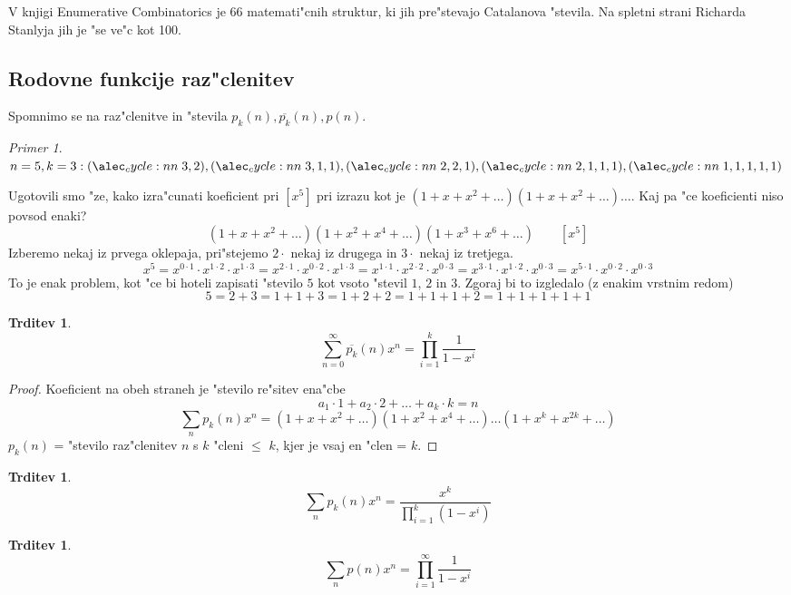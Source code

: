 \documentclass[a4paper,12pt]{article}
\theoremstyle{definition}
\newtheorem{claim}[counter]{Trditev}
\theoremstyle{remark}
\newtheorem*{ex}{Primer}
\begin{document}
V knjigi Enumerative Combinatorics je 66 matemati"cnih struktur, ki jih pre"stevajo Catalanova "stevila. Na spletni strani Richarda Stanlyja jih je "se ve"c kot 100.

\subsection{Rodovne funkcije raz"clenitev}
Spomnimo se na raz"clenitve in "stevila $p_k(n), \overline{p_k}(n), p(n)$.
\begin{ex}
	$n = 5, k = 3: \cycle{3, 2}, \cycle{3, 1, 1}, \cycle{2, 2, 1}, \cycle{2, 1, 1, 1}, \cycle{1, 1, 1, 1, 1}$
\end{ex}

Ugotovili smo "ze, kako izra"cunati koeficient pri $[x^5]$ pri izrazu kot je $(1 + x + x^2 + \ldots)(1 + x + x^2 + \ldots)\ldots$. Kaj pa "ce koeficienti niso povsod enaki?
\[(1 + x + x^2 + \ldots)(1 + x^2 + x^4 + \ldots)(1 + x^3 + x^6 + \ldots) \qquad[x^5]\]
Izberemo nekaj iz prvega oklepaja, pri"stejemo $2\cdot$ nekaj iz drugega in $3 \cdot$ nekaj iz tretjega.
\[x^5 =
x^{0 \cdot 1} \cdot x^{1 \cdot 2} \cdot x^{1 \cdot 3} =
x^{2 \cdot 1} \cdot x^{0 \cdot 2} \cdot x^{1 \cdot 3} =
x^{1 \cdot 1} \cdot x^{2 \cdot 2} \cdot x^{0 \cdot 3} =
x^{3 \cdot 1} \cdot x^{1 \cdot 2} \cdot x^{0 \cdot 3} =
x^{5 \cdot 1} \cdot x^{0 \cdot 2} \cdot x^{0 \cdot 3}\]
To je enak problem, kot "ce bi hoteli zapisati "stevilo $5$ kot vsoto "stevil $1$, $2$ in $3$. Zgoraj bi to izgledalo (z enakim vrstnim redom)
\[5 = 2 + 3 = 1 + 1 + 3 = 1 + 2 + 2 = 1 + 1 + 1 + 2 = 1 + 1 + 1 + 1 + 1\]

\begin{claim}
	\[\sum_{n = 0}^{\infty} \overline{p_k} (n) x^n = \prod_{i = 1}^k \frac{1}{1 - x^i}\]
\end{claim}

\begin{proof}
	Koeficient na obeh straneh je "stevilo re"sitev ena"cbe
	\[a_1 \cdot 1 + a_2 \cdot 2 + \ldots + a_k \cdot k = n\]
	\[\sum_n p_k (n) x^n =  (1 + x + x^2 + \ldots) (1 + x^2+ x^4 + \ldots) \ldots (1 + x^k+ x^{2k} + \ldots)\]
	$p_k (n)$ = "stevilo raz"clenitev $n$ s $k$ "cleni $\leqslant$ $k$, kjer je vsaj en "clen = $k$.
\end{proof}

\begin{claim}
	\[\sum_n p_k(n) x^n = \frac{x^k}{\prod_{i = 1}^k (1 - x^i)}\]
\end{claim}

\begin{claim}
	\[\sum_n p(n) x^n = \prod_{i = 1}^{\infty} \frac{1}{1 - x^i}\]
\end{claim}
\end{document}
